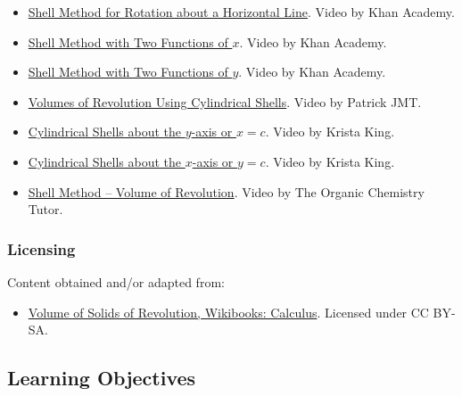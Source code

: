 \begin{itemize}
\item \href{https://www.youtube.com/watch?v=R-Qu3QWOEiA}{Shell Method for Rotation about a Horizontal Line}.  
Video by Khan Academy.

\item \href{https://www.youtube.com/watch?v=SfWrVNyP9E8}{Shell Method with Two Functions of $x$}.  
Video by Khan Academy.

\item \href{https://www.youtube.com/watch?v=OelluIKIkCY}{Shell Method with Two Functions of $y$}.  
Video by Khan Academy.

\item \href{https://youtu.be/CiXME1u-oyU}{Volumes of Revolution Using Cylindrical Shells}.  
Video by Patrick JMT.

\item \href{https://youtu.be/DQihcRym9Ew}{Cylindrical Shells about the $y$-axis or $x=c$}.  
Video by Krista King.

\item \href{https://youtu.be/Sa2FDL3hmJo}{Cylindrical Shells about the $x$-axis or $y=c$}.  
Video by Krista King.

\item \href{https://youtu.be/fE6vmorV-rA}{Shell Method – Volume of Revolution}.  
Video by The Organic Chemistry Tutor.

\end{itemize}

\subsubsection{Licensing}
\label{sss:lice-7352}

Content obtained and/or adapted from:

\begin{itemize}

\item \href{https://en.wikibooks.org/wiki/Calculus/Volume_of_solids_of_revolution}{Volume of Solids of Revolution, Wikibooks: Calculus}.  
Licensed under CC BY-SA.

\end{itemize}


\subsection{Learning Objectives}

